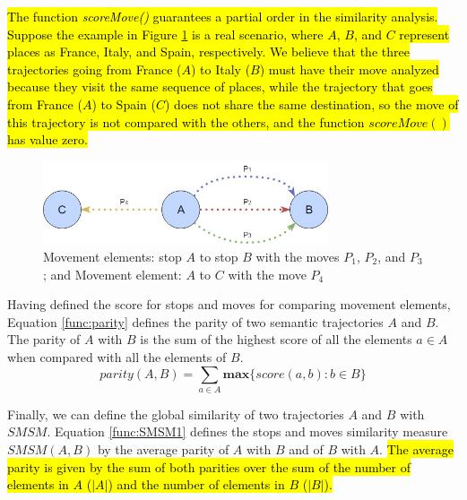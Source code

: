 \documentclass[12pt]{article}
\begin{document}
\hl{The function \emph{scoreMove()} guarantees a partial order in the similarity analysis. %
Suppose the example in  Figure {\ref{fig:move}} is a real scenario, where $A$, $B$, and $C$ represent  places as France, Italy, and Spain, respectively. We believe that the three trajectories going from France ($A$) to Italy ($B$) must have their move analyzed because they visit the same sequence of places, while the trajectory that goes from France ($A$) to Spain ($C$) does not share the same destination, so the move of this trajectory is not compared with the others, and the function $scoreMove()$ has value zero.}



\begin{figure}[h]
\centering
\includegraphics[width=0.75\textwidth]{Images/Toy_trajectories.jpg}
\caption{\label{fig:move} Movement elements: stop $A$ to stop $B$ with the moves $P_1$, $P_2$, and $P_3$; and Movement element: $A$ to $C$ with the move $P_4$}
\end{figure}

Having defined the score for stops and moves for comparing movement elements, Equation \ref{func:parity} defines the parity of two semantic trajectories $A$ and $B$. The parity of $A$ with $B$ is the sum of the highest score of all the elements $a \in A$ when compared with all the elements of $B$.
\begin{equation}
\label{func:parity}
parity(A, B) = \sum\limits_{a\in A} \textbf{max}\{\textit{score}(a, b) : b \in B\}
\end{equation}

Finally, we can define the global similarity of two trajectories $A$ and $B$ with $SMSM$. Equation \ref{func:SMSM1} defines the stops and moves similarity measure $SMSM(A,B)$ by the average parity of $A$ with $B$ and of $B$ with $A$. \hl{The average parity is given by the sum of both parities over the sum of the number of elements in $A$ ($|A|$) and the number of elements in $B$ ($|B|$).}
\end{document}
